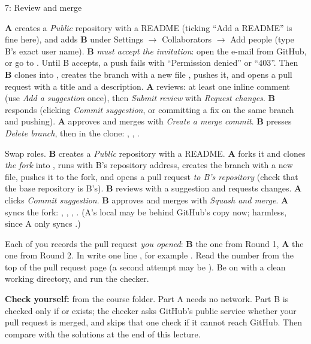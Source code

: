\begin{homework}{7: Review and merge}
\begin{description}[leftmargin=1.2em,style=nextline]
\item[7.7 Round 1: shared repository, B's pull request] \textbf{A} creates a \emph{Public} repository  with a README (ticking ``Add a README'' is fine here), and adds \textbf{B} under Settings $\rightarrow$ Collaborators $\rightarrow$ Add people (type B's exact user name). \textbf{B} \emph{must accept the invitation}: open the e-mail from GitHub, or go to . Until B accepts, a push fails with ``Permission denied'' or ``403''. Then \textbf{B} clones into , creates the branch  with a new file , pushes it, and opens a pull request with a title and a description. \textbf{A} reviews: at least one inline comment (use \emph{Add a suggestion} once), then \emph{Submit review} with \emph{Request changes}. \textbf{B} responds (clicking \emph{Commit suggestion}, or committing a fix on the same branch and pushing). \textbf{A} approves and merges with \emph{Create a merge commit}. \textbf{B} presses \emph{Delete branch}, then in the clone: , , .
\item[7.8 Round 2: fork, A's pull request] Swap roles. \textbf{B} creates a \emph{Public} repository  with a README. \textbf{A} forks it and clones \emph{the fork} into , runs  with B's repository address, creates the branch  with a new file, pushes it to the fork, and opens a pull request \emph{to B's repository} (check that the base repository is B's). \textbf{B} reviews with a suggestion and requests changes. \textbf{A} clicks \emph{Commit suggestion}. \textbf{B} approves and merges with \emph{Squash and merge}. \textbf{A} syncs the fork: , , , . (A's local  may be behind GitHub's copy now; harmless, since A only syncs .)
\item[7.9 Record and check] Each of you records the pull request \emph{you opened}: \textbf{B} the one from Round 1, \textbf{A} the one from Round 2. In  write one line , for example . Read the number from the top of the pull request page (a second attempt may be ). Be on  with a clean working directory, and run the checker.
\end{description}

\textbf{Check yourself:}  from the course folder. Part A needs no network. Part B is checked only if  or  exists; the checker asks GitHub's public service whether your pull request is merged, and skips that one check if it cannot reach GitHub. Then compare with the solutions at the end of this lecture.
\end{homework}

